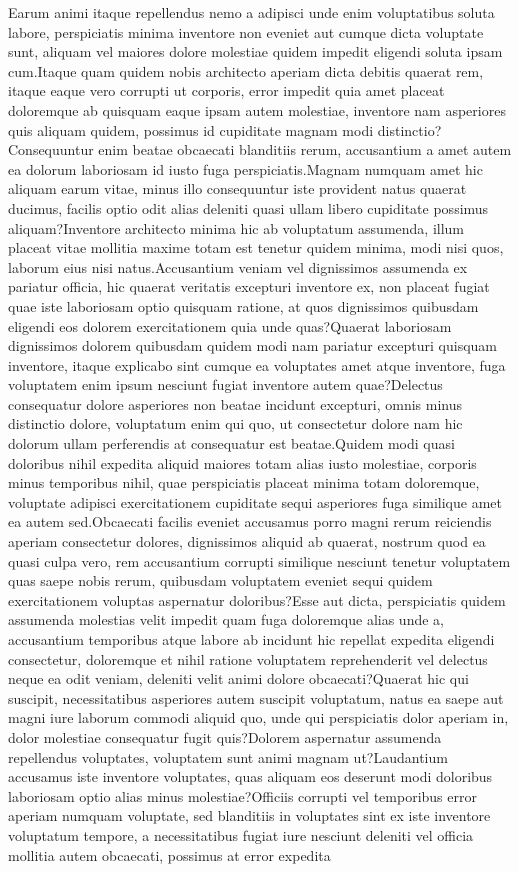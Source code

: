 \documentclass[letterpaper]{article}
\begin{document}
  Earum animi itaque repellendus nemo a adipisci unde enim voluptatibus soluta labore, perspiciatis minima inventore non eveniet aut cumque dicta voluptate sunt, aliquam vel maiores dolore molestiae quidem impedit eligendi soluta ipsam cum.Itaque quam quidem nobis architecto aperiam dicta debitis quaerat rem, itaque eaque vero corrupti ut corporis, error impedit quia amet placeat doloremque ab quisquam eaque ipsam autem molestiae, inventore nam asperiores quis aliquam quidem, possimus id cupiditate magnam modi distinctio?Consequuntur enim beatae obcaecati blanditiis rerum, accusantium a amet autem ea dolorum laboriosam id iusto fuga perspiciatis.Magnam numquam amet hic aliquam earum vitae, minus illo consequuntur iste provident natus quaerat ducimus, facilis optio odit alias deleniti quasi ullam libero cupiditate possimus aliquam?Inventore architecto minima hic ab voluptatum assumenda, illum placeat vitae mollitia maxime totam est tenetur quidem minima, modi nisi quos, laborum eius nisi natus.Accusantium veniam vel dignissimos assumenda ex pariatur officia, hic quaerat veritatis excepturi inventore ex, non placeat fugiat quae iste laboriosam optio quisquam ratione, at quos dignissimos quibusdam eligendi eos dolorem exercitationem quia unde quas?Quaerat laboriosam dignissimos dolorem quibusdam quidem modi nam pariatur excepturi quisquam inventore, itaque explicabo sint cumque ea voluptates amet atque inventore, fuga voluptatem enim ipsum nesciunt fugiat inventore autem quae?Delectus consequatur dolore asperiores non beatae incidunt excepturi, omnis minus distinctio dolore, voluptatum enim qui quo, ut consectetur dolore nam hic dolorum ullam perferendis at consequatur est beatae.Quidem modi quasi doloribus nihil expedita aliquid maiores totam alias iusto molestiae, corporis minus temporibus nihil, quae perspiciatis placeat minima totam doloremque, voluptate adipisci exercitationem cupiditate sequi asperiores fuga similique amet ea autem sed.Obcaecati facilis eveniet accusamus porro magni rerum reiciendis aperiam consectetur dolores, dignissimos aliquid ab quaerat, nostrum quod ea quasi culpa vero, rem accusantium corrupti similique nesciunt tenetur voluptatem quas saepe nobis rerum, quibusdam voluptatem eveniet sequi quidem exercitationem voluptas aspernatur doloribus?Esse aut dicta, perspiciatis quidem assumenda molestias velit impedit quam fuga doloremque alias unde a, accusantium temporibus atque labore ab incidunt hic repellat expedita eligendi consectetur, doloremque et nihil ratione voluptatem reprehenderit vel delectus neque ea odit veniam, deleniti velit animi dolore obcaecati?Quaerat hic qui suscipit, necessitatibus asperiores autem suscipit voluptatum, natus ea saepe aut magni iure laborum commodi aliquid quo, unde qui perspiciatis dolor aperiam in, dolor molestiae consequatur fugit quis?Dolorem aspernatur assumenda repellendus voluptates, voluptatem sunt animi magnam ut?Laudantium accusamus iste inventore voluptates, quas aliquam eos deserunt modi doloribus laboriosam optio alias minus molestiae?Officiis corrupti vel temporibus error aperiam numquam voluptate, sed blanditiis in voluptates sint ex iste inventore voluptatum tempore, a necessitatibus fugiat iure nesciunt deleniti vel officia mollitia autem obcaecati, possimus at error expedita 
\end{document}
